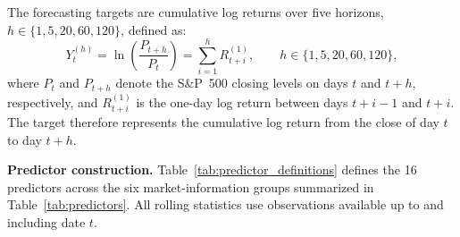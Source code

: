 \documentclass[runningheads,orivec]{llncs}
\begin{document}
The forecasting targets are cumulative log returns over five horizons, $h \in \{1, 5, 20, 60, 120\}$, defined as:
\begin{equation}\label{eq:target_return}
Y_t^{(h)} = \ln\left(\frac{P_{t+h}}{P_t}\right) = \sum_{i=1}^h R_{t+i}^{(1)}, \qquad h \in \{1, 5, 20, 60, 120\},
\end{equation}
where $P_t$ and $P_{t+h}$ denote the S\&P~500 closing levels on days $t$ and $t+h$, respectively, and $R_{t+i}^{(1)}$ is the one-day log return between days $t+i-1$ and $t+i$. The target therefore represents the cumulative log return from the close of day $t$ to day $t+h$.

\noindent\textbf{Predictor construction.} Table~\ref{tab:predictor_definitions} defines the 16 predictors across the six market-information groups summarized in Table~\ref{tab:predictors}. All rolling statistics use observations available up to and including date $t$.
\end{document}
